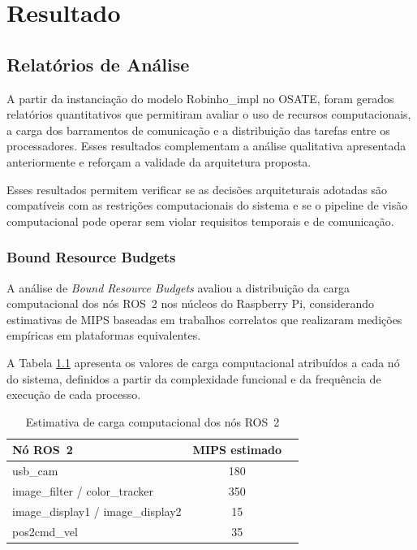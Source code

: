 \chapter{Resultado}

\section{Relatórios de Análise}

A partir da instanciação do modelo Robinho\_impl no OSATE, foram gerados relatórios quantitativos que permitiram avaliar o uso de recursos computacionais, a carga dos barramentos de comunicação e a distribuição das tarefas entre os processadores. Esses resultados complementam a análise qualitativa apresentada anteriormente e reforçam a validade da arquitetura proposta.

Esses resultados permitem verificar se as decisões arquiteturais adotadas são compatíveis com as restrições computacionais do sistema e se o pipeline de visão computacional pode operar sem violar requisitos temporais e de comunicação.

\subsection{Bound Resource Budgets}

A análise de \textit{Bound Resource Budgets} avaliou a distribuição da carga computacional dos nós ROS~2 nos núcleos do Raspberry Pi, considerando estimativas de MIPS baseadas em trabalhos correlatos que realizaram medições empíricas em plataformas equivalentes.

A Tabela \ref{tab:mips_estimativa} apresenta os valores de carga computacional atribuídos a cada nó do sistema, definidos a partir da complexidade funcional e da frequência de execução de cada processo.

\begin{table}[H]
\centering
\caption{Estimativa de carga computacional dos nós ROS~2}
\label{tab:mips_estimativa}
\begin{tabular}{l c l}
\hline
\textbf{Nó ROS~2} & \textbf{MIPS estimado} \\
\hline
    usb\_cam & 180 \\
    image\_filter / color\_tracker & 350 \\
    image\_display1 / image\_display2 & 15 \\
    pos2cmd\_vel & 35 \\
\hline

\end{tabular}
\end{table}

